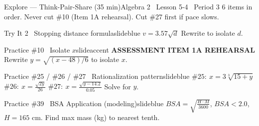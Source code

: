 \documentclass[aspectratio=169, 11pt]{beamer}
\begin{document}
\begin{frame}{Explore --- Think-Pair-Share (35 min)}{Algebra 2 \textperiodcentered\ Lesson 5-4 \textperiodcentered\ Period 3}
\small\textcolor{slidegray}{6 items in order. Never cut \#10 (Item 1A rehearsal). Cut \#27 first if pace slows.}

\vspace{0.1cm}
\begin{projcard}{Try It 2 \textperiodcentered\ Stopping distance formula}{slideblue}
\(v = 3.57\sqrt{d}\) \quad Rewrite to isolate \(d\).
\end{projcard}
\vspace{-0.12cm}
\begin{projcard}{Practice \#10 \textperiodcentered\ Isolate \(x\)}{slideaccent}
\textcolor{slideaccent}{\bfseries ASSESSMENT ITEM 1A REHEARSAL} \quad
Rewrite \(y = \sqrt{(x-48)/6}\) to isolate \(x\).
\end{projcard}
\vspace{-0.12cm}
\begin{projcard}{Practice \#25 / \#26 / \#27 \textperiodcentered\ Rationalization pattern}{slideblue}
\(\#25\!:\ x=3\sqrt[3]{15+y}\) \quad
\(\#26\!:\ x=\tfrac{\sqrt{2y}}{26}\) \quad
\(\#27\!:\ x=\tfrac{\sqrt{y-14.2}}{0.05}\) \quad Solve for \(y\).
\end{projcard}
\vspace{-0.12cm}
\begin{projcard}{Practice \#39 \textperiodcentered\ BSA Application (modeling)}{slideblue}
\(BSA = \sqrt{\tfrac{H \cdot M}{3600}}\), \(BSA < 2.0\), \(H = 165\) cm.
Find max mass (kg) to nearest tenth.
\end{projcard}
\end{frame}
\end{document}
